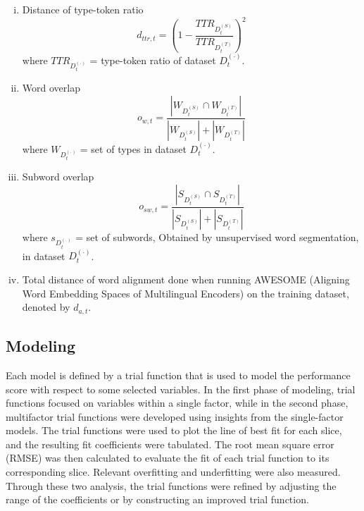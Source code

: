\documentclass[11pt]{article}
\begin{document}
\begin{enumerate}[(a)]
\begin{enumerate}[(i)]
        \item Distance of type-token ratio
        \begin{equation*}
            d_{ttr,t} = \left( 1 - \frac{TTR_{D_t^{(S)}}}{TTR_{D_t^{(T)}}}\right)^2
        \end{equation*}
        where $TTR_{D_t^{(\cdot)}}$ = type-token ratio of dataset $D_t^{(\cdot)}$.

        \item Word overlap
        \begin{equation*}
            o_{w,t} = \frac{|W_{D_t^{(S)}} \cap W_{D_t^{(T)}}|}{|W_{D_t^{(S)}}| + |W_{D_t^{(T)}}|}
        \end{equation*}
        where $W_{D_t^{(\cdot)}}$ = set of types in dataset $D_t^{(\cdot)}$.

        \item Subword overlap
        \begin{equation*}
            o_{sw,t} = \frac{|S_{D_t^{(S)}} \cap S_{D_t^{(T)}}|}{|S_{D_t^{(S)}}| + |S_{D_t^{(T)}}|}
        \end{equation*}
        where $s_{D_t^{(\cdot)}}$ = set of subwords, Obtained by unsupervised word segmentation, in dataset $D_t^{(\cdot)}$.

        \item Total distance of word alignment done when running AWESOME (Aligning Word Embedding Spaces of Multilingual Encoders) on the training dataset, denoted by $d_{a,t}$.
    \end{enumerate}
    
\end{enumerate}

\begin{enumerate}

    
\end{enumerate}

\subsection{Modeling}

Each model is defined by a trial function that is used to model the performance score with respect to some selected variables. In the first phase of modeling, trial functions focused on variables within a single factor, while in the second phase, multifactor trial functions were developed using insights from the single-factor models.
The trial functions were used to plot the line of best fit for each slice, and the resulting fit coefficients were tabulated. The root mean square error (RMSE) was then calculated to evaluate the fit of each trial function to its corresponding slice. Relevant overfitting and underfitting were also measured. Through these two analysis, the trial functions were refined by adjusting the range of the coefficients or by constructing an improved trial function.
\end{document}
